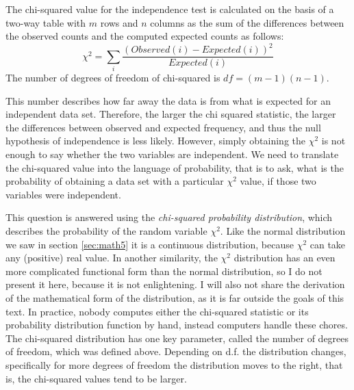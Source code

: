 \documentclass[
  letterpaper,
  DIV=11,
  numbers=noendperiod]{scrreprt}
\begin{document}
\begin{tcolorbox}[enhanced jigsaw, coltitle=black, arc=.35mm, opacitybacktitle=0.6, breakable, bottomtitle=1mm, toptitle=1mm, titlerule=0mm, colback=white, leftrule=.75mm, rightrule=.15mm, colframe=quarto-callout-note-color-frame, colbacktitle=quarto-callout-note-color!10!white, opacityback=0, title=\textcolor{quarto-callout-note-color}{\faInfo}\hspace{0.5em}{Definition}, left=2mm, toprule=.15mm, bottomrule=.15mm]

The chi-squared value for the independence test is calculated on the
basis of a two-way table with \(m\) rows and \(n\) columns as the sum of
the differences between the observed counts and the computed expected
counts as follows:
\[\chi^2= \sum_i \frac{(Observed(i)-Expected(i))^2}{Expected(i)}\] The
number of degrees of freedom of chi-squared is \(df = (m-1)(n-1)\).

\end{tcolorbox}

This number describes how far away the data is from what is expected for
an independent data set. Therefore, the larger the chi squared
statistic, the larger the differences between observed and expected
frequency, and thus the null hypothesis of independence is less likely.
However, simply obtaining the \(\chi^2\) is not enough to say whether
the two variables are independent. We need to translate the chi-squared
value into the language of probability, that is to ask, what is the
probability of obtaining a data set with a particular \(\chi^2\) value,
if those two variables were independent.

This question is answered using the \emph{chi-squared probability
distribution}, which describes the probability of the random variable
\(\chi^2\). Like the normal distribution we saw in section
\ref{sec:math5} it is a continuous distribution, because \(\chi^2\) can
take any (positive) real value. In another similarity, the \(\chi^2\)
distribution has an even more complicated functional form than the
normal distribution, so I do not present it here, because it is not
enlightening. I will also not share the derivation of the mathematical
form of the distribution, as it is far outside the goals of this text.
In practice, nobody computes either the chi-squared statistic or its
probability distribution function by hand, instead computers handle
these chores. The chi-squared distribution has one key parameter, called
the number of degrees of freedom, which was defined above. Depending on
d.f. the distribution changes, specifically for more degrees of freedom
the distribution moves to the right, that is, the chi-squared values
tend to be larger.
\end{document}
